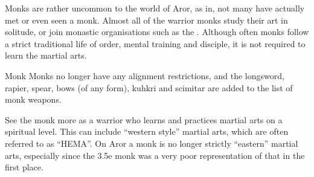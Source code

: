 Monks are rather uncommon to the world of Aror, as in, not many have actually
met or even seen a monk. Almost all of the warrior monks study their art in
solitude, or join monastic organisations such as the .
Although often monks follow a strict traditional life of order, mental training
and disciple, it is not required to learn the martial arts.

\begin{35e}{Monk}
  Monks no longer have any alignment restrictions, and the longsword, rapier,
  spear, bows (of any form), kuhkri and scimitar are added to the list of monk
  weapons.
\end{35e}

\begin{note}
  See the monk more as a warrior who learns and practices martial arts on a
  spiritual level. This can include ``western style'' martial arts, which are
  often referred to as ``HEMA''. On Aror a monk is no longer strictly
  ``eastern'' martial arts, especially since the 3.5e monk was a very poor
  representation of that in the first place.
\end{note}
